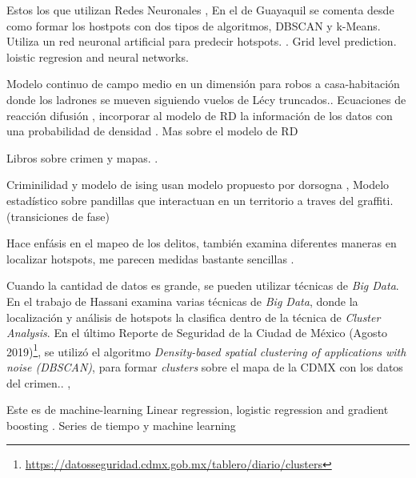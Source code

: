 \documentclass[onecolumn,12pt,letterpaper]{article}
\begin{document}
Estos los que utilizan Redes Neuronales \cite{francisco_alisis_2015}, \cite{olligschlaeger_artificial_1998}
En el de Guayaquil se comenta desde como formar los hostpots con dos tipos de algoritmos, DBSCAN y k-Means. Utiliza un red neuronal artificial para predecir hotspots.\cite{garcia-plua_deteccion_2017} \cite{zhuang_crime_2017}. Grid level prediction. loistic regresion and neural networks. \cite{rummens_use_2017}

Modelo continuo de campo medio en un dimensión para robos a casa-habitación donde los ladrones se mueven siguiendo vuelos de Lécy truncados.\cite{pan_crime_2018}. Ecuaciones de reacción difusión \cite{short_dissipation_2010}, incorporar al modelo de RD la información de los datos con una probabilidad de densidad \cite{woodworth_j._t._non-local_2014}. Mas sobre el modelo de RD \cite{short_nonlinear_2010}


Libros sobre crimen y mapas. \cite{rossmo_geographic_2014} \cite{santos_crime_2016} \cite{liu_artificial_2008} \cite{weisburd_crime_1998} \cite{chainey_crime_2008}. 


Criminilidad y modelo de ising usan modelo propuesto por dorsogna \cite{ayouche_second_2015}, 
Modelo estadístico sobre pandillas que interactuan en un territorio a traves del graffiti.(transiciones de fase)\cite{barbaro_territorial_2013}

Hace enfásis en el mapeo de los delitos, también examina diferentes maneras en localizar hotspots, me parecen medidas bastante sencillas \cite{ratcliffe_crime_2010}. 


Cuando la cantidad de datos es grande, se pueden utilizar técnicas de \textit{Big Data}. En el trabajo de Hassani\cite{hassani_review_2016} examina varias técnicas de \textit{Big Data}, donde  la localización y análisis de hotspots la clasifica dentro de la técnica de \textit{Cluster Analysis}. En el último Reporte de Seguridad de la Ciudad de México (Agosto 2019)\footnote{\url{https://datosseguridad.cdmx.gob.mx/tablero/diario/clusters}}, se utilizó el algoritmo \textit{Density-based spatial clustering of applications with noise (DBSCAN)}, para formar \textit{clusters} sobre el mapa de la CDMX con los datos del crimen.\cite{noauthor_datos_nodate}.  \cite{noauthor_big_nodate} \cite{chen_crime_2004},


Este es de machine-learning \cite{alves_crime_2018}
Linear regression, logistic regression and gradient boosting \cite{ingilevich_crime_2018}. Series de tiempo y machine learning \cite{wang_learning_2013}
\end{document}
